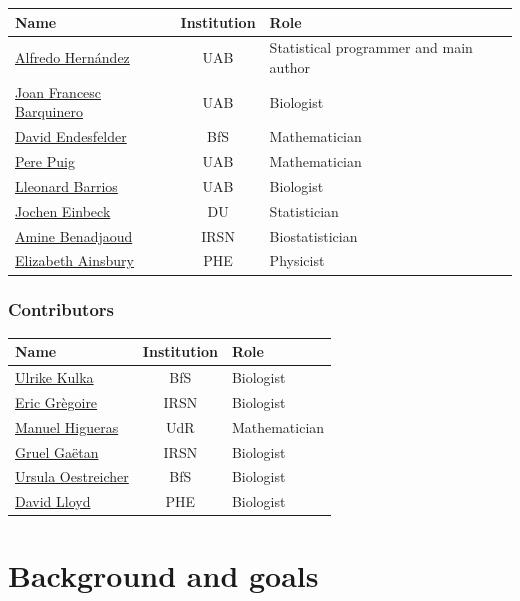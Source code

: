 \documentclass[]{scrartcl}
\begin{document}
\begin{longtable}[]{@{}lcl@{}}
\toprule
Name & Institution & Role\tabularnewline
\midrule
\endhead
\href{http://aldomann.com}{Alfredo Hernández} & UAB & Statistical programmer and main author\tabularnewline
\href{https://orcid.org/0000-0003-0084-5268}{Joan Francesc Barquinero} & UAB & Biologist\tabularnewline
\href{https://www.researchgate.net/profile/David_Endesfelder2}{David Endesfelder} & BfS & Mathematician\tabularnewline
\href{http://grupsderecerca.uab.cat/advancedstochasticmodelling/content/pere-puig}{Pere Puig} & UAB & Mathematician\tabularnewline
\href{https://orcid.org/0000-0002-6151-8503}{Lleonard Barrios} & UAB & Biologist\tabularnewline
\href{https://orcid.org/0000-0002-9457-2020}{Jochen Einbeck} & DU & Statistician\tabularnewline
\href{https://www.researchgate.net/profile/Mohamed_Benadjaoud}{Amine Benadjaoud} & IRSN & Biostatistician\tabularnewline
\href{https://www.phe-protectionservices.org.uk/cds/team/liz_ainsbury}{Elizabeth Ainsbury} & PHE & Physicist\tabularnewline
\bottomrule
\end{longtable}

\hypertarget{contributors}{%
\subsubsection*{Contributors}\label{contributors}}

\begin{longtable}[]{@{}lcl@{}}
\toprule
Name & Institution & Role\tabularnewline
\midrule
\endhead
\href{https://orcid.org/0000-0002-7734-3162}{Ulrike Kulka} & BfS & Biologist\tabularnewline
\href{https://www.researchgate.net/profile/Eric_Gregoire2}{Eric Grègoire} & IRSN & Biologist\tabularnewline
\href{https://investigacion.unirioja.es/investigadores/1322/detalle}{Manuel Higueras} & UdR & Mathematician\tabularnewline
\href{https://www.researchgate.net/profile/Gruel_Gaetan}{Gruel Gaëtan} & IRSN & Biologist\tabularnewline
\href{https://www.researchgate.net/scientific-contributions/2121336457_Ursula_Oestreicher}{Ursula Oestreicher} & BfS & Biologist\tabularnewline
\href{https://www.phe-protectionservices.org.uk/cds/team/david_lloyd}{David Lloyd} & PHE & Biologist\tabularnewline
\bottomrule
\end{longtable}

\hypertarget{background-and-goals}{%
\section*{Background and goals}\label{background-and-goals}}
\end{document}
